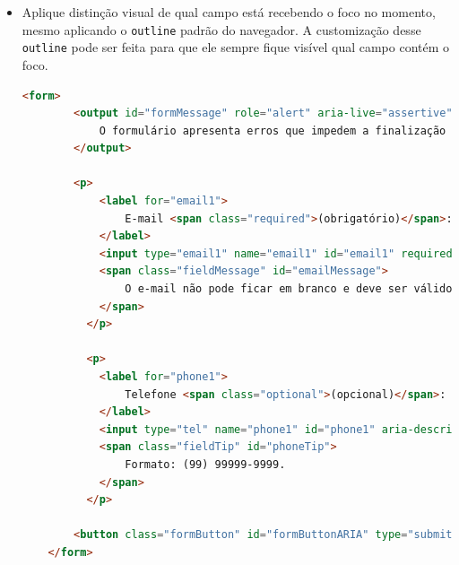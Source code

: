 {\begin{itemize}
\begin{itemize}
        \item Adicione um área para mensagem informativa de forma geral do formulário e uma área de mensagem abaixo de cada campo com erro. Esta área de mensagem informativa do formulário possui os atributos \lstinline{role="alert"}, que avisa que é uma mensagem de alerta e \lstinline{aria-live="assertive"} que informa que é um campo que pode sofrer modificações no conteúdo e o leitor de telas é informado quando há modificação neste campo;
    \end{itemize}
    \item Aplique distinção visual de qual campo está recebendo o foco no momento, mesmo aplicando o \lstinline{outline} padrão do navegador. A customização desse \lstinline{outline} pode ser feita para que ele sempre fique visível qual campo contém o foco.
    
    {\begin{lstlisting}[language=html, caption=Formulário acessível]
    <form>
        <output id="formMessage" role="alert" aria-live="assertive" tabindex="0" class="error">
            O formulário apresenta erros que impedem a finalização do seu cadastro. Confira se todos os campos obrigatórios foram preenchidos e tente novamente.
        </output>

        <p>
            <label for="email1">
                E-mail <span class="required">(obrigatório)</span>:
            </label>
            <input type="email1" name="email1" id="email1" required="" aria-invalid="true" aria-describedby="emailMessage">
            <span class="fieldMessage" id="emailMessage">
                O e-mail não pode ficar em branco e deve ser válido.
            </span>
          </p>
  
          <p>
            <label for="phone1">
                Telefone <span class="optional">(opcional)</span>:
            </label>
            <input type="tel" name="phone1" id="phone1" aria-describedby="phoneTip">
            <span class="fieldTip" id="phoneTip">
                Formato: (99) 99999-9999.
            </span>
          </p>

        <button class="formButton" id="formButtonARIA" type="submit">Finalizar cadastro</button>
    </form>
    \end{lstlisting}}
    

\end{itemize}}
